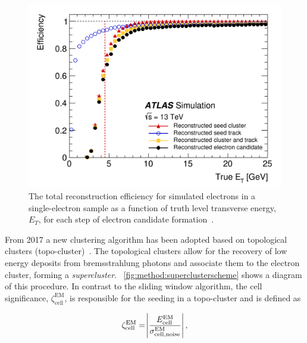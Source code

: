 \begin{figure}[]
    \centering
    \includegraphics[width=\mediumfigwidth]{images/2015_2016_recoeff.png}
    \caption[Total reconstruction energy for simulated electrons using the sliding window algorithm]{The total reconstruction efficiency for simulated electrons in a single-electron sample as a function of truth level transverse energy, $E_T$, for each step of electron candidate formation~\cite{slidingwindowreco}.}
    \label{fig:method:slidingwindow-reco}
\end{figure}

From 2017 a new clustering algorithm has been adopted based on topological clusters (topo-cluster)~\cite{Aad:2019tso}. The topological clusters allow for the recovery of low energy deposits from bremsstrahlung photons and associate them to the electron cluster, forming a \emph{supercluster}. ~\cref{fig:method:superclusterscheme} shows a diagram of this procedure. In contrast to the sliding window algorithm, the cell significance, $\zeta^{\mathrm{EM}}_{\mathrm{cell}}$, is responsible for the seeding in a topo-cluster and is defined as

\begin{equation}
    \zeta^{\mathrm{EM}}_{\mathrm{cell}} = \abs{\frac{E^{\mathrm{EM}}_{\mathrm{cell}}}{\sigma^{\mathrm{EM}}_{\mathrm{cell,noise}}}},
\end{equation}

